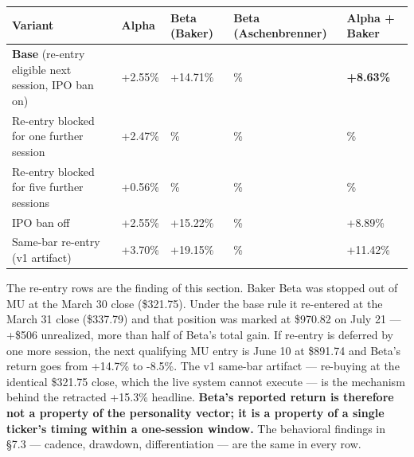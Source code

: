 \documentclass[11pt]{article}
\begin{document}
{\def\LTcaptype{none} %
{\small
\begin{longtable}{@{}
  >{\raggedright\arraybackslash}p{}
  >{\raggedright\arraybackslash}p{}
  >{\raggedright\arraybackslash}p{}
  >{\raggedright\arraybackslash}p{}
  >{\raggedright\arraybackslash}p{}@{}}
\toprule\noalign{}
\begin{minipage}[b]{\linewidth}\raggedright
Variant
\end{minipage} & \begin{minipage}[b]{\linewidth}\raggedright
Alpha
\end{minipage} & \begin{minipage}[b]{\linewidth}\raggedright
Beta (Baker)
\end{minipage} & \begin{minipage}[b]{\linewidth}\raggedright
Beta (Aschenbrenner)
\end{minipage} & \begin{minipage}[b]{\linewidth}\raggedright
Alpha + Baker
\end{minipage} \\
\midrule\noalign{}
\endhead
\bottomrule\noalign{}
\endlastfoot
\renewcommand{\arraystretch}{1.15}
\textbf{Base} (re-entry eligible next session, IPO ban on) & +2.55\% & +14.71\% & -5.67\% & \textbf{+8.63\%} \\
Re-entry blocked for one further session & +2.47\% & -8.46\% & -6.51\% & -2.99\% \\
Re-entry blocked for five further sessions & +0.56\% & -7.16\% & -4.59\% & -3.30\% \\
IPO ban off & +2.55\% & +15.22\% & -10.78\% & +8.89\% \\
Same-bar re-entry (v1 artifact) & +3.70\% & +19.15\% & -4.16\% & +11.42\% \\
\end{longtable}}
}

The re-entry rows are the finding of this section. Baker Beta was stopped out of MU at the March 30 close (\$321.75). Under the base rule it re-entered at the March 31 close (\$337.79) and that position was marked at \$970.82 on July 21 --- +\$506 unrealized, more than half of Beta's total gain. If re-entry is deferred by one more session, the next qualifying MU entry is June 10 at \$891.74 and Beta's return goes from +14.7\% to -8.5\%. The v1 same-bar artifact --- re-buying at the identical \$321.75 close, which the live system cannot execute --- is the mechanism behind the retracted +15.3\% headline. \textbf{Beta's reported return is therefore not a property of the personality vector; it is a property of a single ticker's timing within a one-session window.} The behavioral findings in §7.3 --- cadence, drawdown, differentiation --- are the same in every row.
\end{document}
